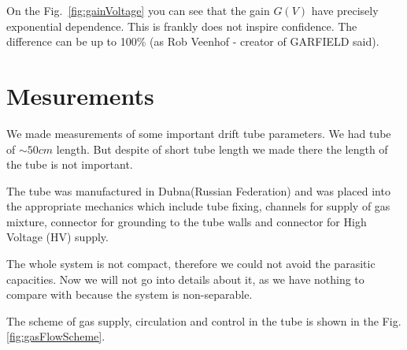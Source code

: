 \documentclass[12pt,a4paper]{article}
\begin{document}
	On the Fig.~\ref{fig:gainVoltage} you can see that the gain $G(V)$ have precisely exponential dependence. This is frankly does not inspire confidence. The difference can be up to 100\% (as Rob Veenhof - creator of GARFIELD \cite{garfield} said).
	
	
		
	
		
	\section{Mesurements}
	\label{sec:Mesurements}	
	
	We made measurements of some important drift tube parameters. We had tube of $\sim 50cm$ length. But despite of short tube length we made there the length of the tube is not important.
	
	The tube was manufactured in Dubna(Russian Federation) and was placed into the appropriate  mechanics which include tube fixing, channels for supply of gas mixture, connector for grounding to the tube walls and connector for High Voltage (HV) supply.
	
	The whole system is not compact, therefore we could not avoid the parasitic capacities. Now we will not go into details about it, as we have nothing to compare with because the system is non-separable.

	The scheme of gas supply, circulation and control in the tube is shown in the Fig.\ref{fig:gasFlowScheme}.
	 	
	
	
	
	
\end{document}
